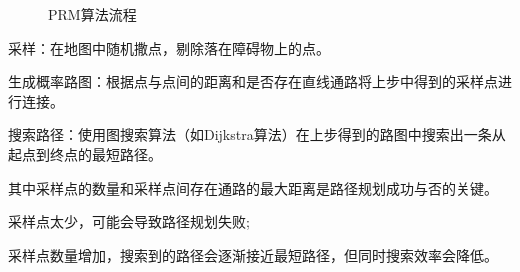 \documentclass[conference]{IEEEtran}
\begin{document}
\begin{figure}[!t]
    \centering
    \caption{ PRM算法流程 }
    \label{fig:PRM算法流程}
\end{figure}

采样：在地图中随机撒点，剔除落在障碍物上的点。

生成概率路图：根据点与点间的距离和是否存在直线通路将上步中得到的采样点进行连接。

搜索路径：使用图搜索算法（如Dijkstra算法）在上步得到的路图中搜索出一条从起点到终点的最短路径。

其中采样点的数量和采样点间存在通路的最大距离是路径规划成功与否的关键。

采样点太少，可能会导致路径规划失败;

采样点数量增加，搜索到的路径会逐渐接近最短路径，但同时搜索效率会降低。
\end{document}
